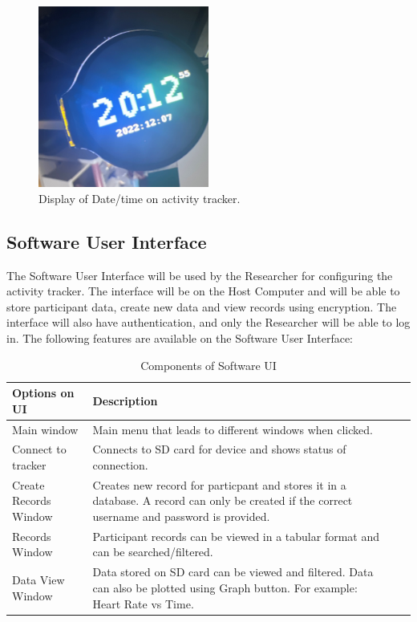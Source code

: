 \documentclass[12pt, titlepage]{article}
\begin{document}
\begin{figure}[H]
	\begin{center}
		 \includegraphics[width=0.5\textwidth]{DisplayTime}
		\caption{Display of Date/time on activity tracker.}
		\label{DisplayTime} 
	\end{center}
\end{figure}

\subsection{Software User Interface}

The Software User Interface will be used by the Researcher for configuring the activity tracker. The interface will be on the Host Computer and will be able to store participant data, create new data and view records using encryption. The interface will also have authentication, and only the Researcher will be able to log in. The following features are available on the Software User Interface:

\begin{table}[H]
	\begin{tabularx}{1.05\textwidth} { 
		  | >{\centering\arraybackslash}X 
		  | >{\centering\arraybackslash}X 
		  | >{\centering\arraybackslash}X 
		  | >{\centering\arraybackslash}X | }
		 \hline
		 \textbf{Options on UI} & \textbf{Description}\\
		 \hline
		Main window & Main menu that leads to different windows when clicked.\\
		\hline
		 Connect to tracker  & Connects to SD card for device and shows status of connection.\\
		 \hline
		   Create Records Window & Creates new record for particpant and stores it in a database. A record can only be created if the correct username and password is provided. \\
		\hline 
		Records Window & Participant records can be viewed in a tabular format and can be searched/filtered.\\
		\hline
		Data View Window & Data stored on SD card can be viewed and filtered. Data can also be plotted using Graph button. For example: Heart Rate vs Time.\\
		\hline
	\end{tabularx}
\caption{\label{Software User Interface}Components of Software UI}  
\end{table}
\end{document}
